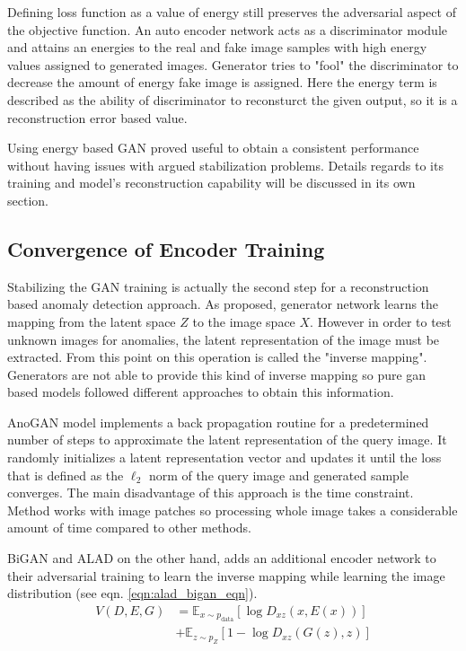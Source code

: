 Defining loss function as a value of energy still preserves the adversarial aspect of the objective
function. An auto encoder network acts as a discriminator module and attains an energies to the real
and fake image samples with high energy values assigned to generated images. Generator tries to
"fool" the discriminator to decrease the amount of energy fake image is assigned. Here the energy
term is described as the ability of discriminator to reconsturct the given output, so it is a
reconstruction error based value. 

Using energy based GAN proved useful to obtain a consistent performance without having issues with
argued stabilization problems. Details regards to its training and model's reconstruction capability
will be discussed in its own section.
\subsection{Convergence of Encoder Training}
\label{sec:conv_enc}

Stabilizing the GAN training is actually the second step for a reconstruction based anomaly
detection approach. As proposed, generator network learns the mapping from the latent space $Z$ to
the image space $X$. However in order to test unknown images for anomalies, the latent
representation of the image must be extracted. From this point on this operation is called the
"inverse mapping". Generators are not able to provide this kind of inverse mapping so pure gan based
models followed different approaches to obtain this information.

AnoGAN model implements a back propagation routine for a predetermined number of steps to approximate
the latent representation of the query image. It randomly initializes a latent representation vector
and updates it until the loss that is defined as the $\ell_{2}$ norm of the query image and
generated sample converges. The main disadvantage of this approach is the time constraint. Method
works with image patches so processing whole image takes a considerable amount of time compared to
other methods.

BiGAN and ALAD on the other hand, adds an additional encoder network to their adversarial training
to learn the inverse mapping while learning the image distribution (see eqn.
\ref{eqn:alad_bigan_eqn}).
\begin{equation}
\label{eqn:alad_bigan_eqn}
\begin{aligned} V\left(D, E, G\right) &=\mathbb{E}_{x \sim p_{\text{data}}}\left[\log D_{x z}(x, E(x))\right] \\ &+\mathbb{E}_{z \sim p_{Z}}\left[1-\log D_{x z}(G(z), z)\right]
\end{aligned}
\end{equation}

